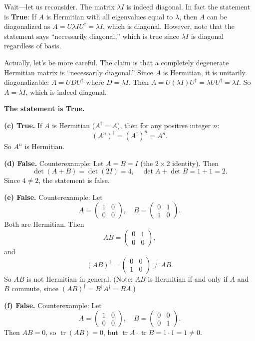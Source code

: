 \documentclass[12pt]{article}
\begin{document}
Wait---let us reconsider. The matrix $\lambda I$ is indeed diagonal. In fact the statement is \textbf{True}: If $A$ is Hermitian with all eigenvalues equal to $\lambda$, then $A$ can be diagonalized as $A = U \lambda I U^\dagger = \lambda I$, which is diagonal. However, note that the statement says ``necessarily diagonal,'' which is true since $\lambda I$ is diagonal regardless of basis.

Actually, let's be more careful. The claim is that a completely degenerate Hermitian matrix is ``necessarily diagonal.'' Since $A$ is Hermitian, it is unitarily diagonalizable: $A = U D U^\dagger$ where $D = \lambda I$. Then $A = U(\lambda I)U^\dagger = \lambda U U^\dagger = \lambda I$. So $A = \lambda I$, which is indeed diagonal.

\textbf{The statement is True.}

\bigskip
\textbf{(c) True.} If $A$ is Hermitian ($A^\dagger = A$), then for any positive integer $n$:
\[
(A^n)^\dagger = (A^\dagger)^n = A^n.
\]
So $A^n$ is Hermitian.

\bigskip
\textbf{(d) False.} Counterexample: Let $A = B = I$ (the $2 \times 2$ identity). Then
\[
\det(A + B) = \det(2I) = 4, \quad \det A + \det B = 1 + 1 = 2.
\]
Since $4 \neq 2$, the statement is false.

\bigskip
\textbf{(e) False.} Counterexample: Let
\[
A = \begin{pmatrix} 1 & 0 \\ 0 & 0 \end{pmatrix}, \quad B = \begin{pmatrix} 0 & 1 \\ 1 & 0 \end{pmatrix}.
\]
Both are Hermitian. Then
\[
AB = \begin{pmatrix} 0 & 1 \\ 0 & 0 \end{pmatrix},
\]
and
\[
(AB)^\dagger = \begin{pmatrix} 0 & 0 \\ 1 & 0 \end{pmatrix} \neq AB.
\]
So $AB$ is not Hermitian in general. (Note: $AB$ is Hermitian if and only if $A$ and $B$ commute, since $(AB)^\dagger = B^\dagger A^\dagger = BA$.)

\bigskip
\textbf{(f) False.} Counterexample: Let
\[
A = \begin{pmatrix} 1 & 0 \\ 0 & 0 \end{pmatrix}, \quad B = \begin{pmatrix} 0 & 0 \\ 0 & 1 \end{pmatrix}.
\]
Then $AB = 0$, so $\operatorname{tr}(AB) = 0$, but $\operatorname{tr} A \cdot \operatorname{tr} B = 1 \cdot 1 = 1 \neq 0$.
\end{document}
